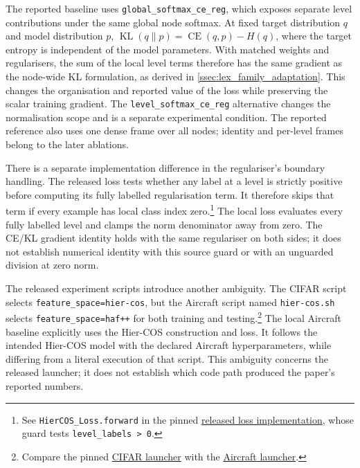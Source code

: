 The reported baseline uses \texttt{global\_softmax\_ce\_reg}, which exposes
separate level contributions under the same global node softmax. At fixed
target distribution $q$ and model distribution $p$,
$\operatorname{KL}(q\|p)=\operatorname{CE}(q,p)-H(q)$, where the target
entropy is independent of the model parameters. With matched weights and
regularisers, the sum of the local level terms therefore has the same
gradient as the node-wide KL formulation, as derived in
\cref{ssec:lex_family_adaptation}. This changes the organisation and reported
value of the loss while preserving the scalar training gradient. The
\texttt{level\_softmax\_ce\_reg} alternative changes the normalisation scope
and is a separate experimental condition. The reported reference also uses
one dense frame over all nodes; identity and per-level frames belong to the
later ablations.

There is a separate implementation difference in the regulariser's boundary
handling. The released loss tests whether any label at a level is strictly
positive before computing its fully labelled regularisation term. It therefore
skips that term if every example has local class index zero.\footnote{See
\texttt{HierCOS\_Loss.forward} in the pinned
\href{https://github.com/Depanshu-Sani/Hier-COS/blob/122b01df/util/hiercos_construction.py}{released loss implementation},
whose guard tests \texttt{level\_labels > 0}.} The local loss
evaluates every fully labelled level and clamps the norm denominator away
from zero. The CE/KL gradient identity holds with the same regulariser on
both sides; it does not establish numerical identity with this source guard
or with an unguarded division at zero norm.

The released experiment scripts introduce another ambiguity. The CIFAR
script selects \texttt{feature\_space=hier-cos}, but the Aircraft script
named \texttt{hier-cos.sh} selects \texttt{feature\_space=haf++} for both
training and testing.\footnote{Compare the pinned
\href{https://github.com/Depanshu-Sani/Hier-COS/blob/122b01df/experiments/cifar-100/hier-cos.sh}{CIFAR launcher}
with the
\href{https://github.com/Depanshu-Sani/Hier-COS/blob/122b01df/experiments/fgvc-aircraft/hier-cos.sh}{Aircraft launcher}.}
The local Aircraft baseline explicitly uses the
Hier-COS construction and loss. It follows the intended Hier-COS model
with the declared Aircraft hyperparameters, while differing from a literal
execution of that script. This ambiguity concerns the released launcher;
it does not establish which code path produced the paper's reported numbers.

